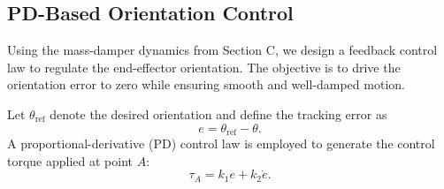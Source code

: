 \documentclass[journal]{IEEEtran}
\begin{document}







\subsection{PD-Based Orientation Control}

Using the mass-damper dynamics from Section C, we design a feedback control law to regulate the end-effector orientation. The objective is to drive the orientation error to zero while ensuring smooth and well-damped motion.

Let $\theta_{\mathrm{ref}}$ denote the desired orientation and define the tracking error as
%
\begin{equation}
e = \theta_{\mathrm{ref}} - \theta.
\end{equation}
%
A proportional-derivative (PD) control law is employed to generate the control torque applied at point $A$:
%
\begin{equation}
\tau_A = k_1 e + k_2 \dot{e}.
\label{eq:pd_control}
\end{equation}
%
\end{document}
